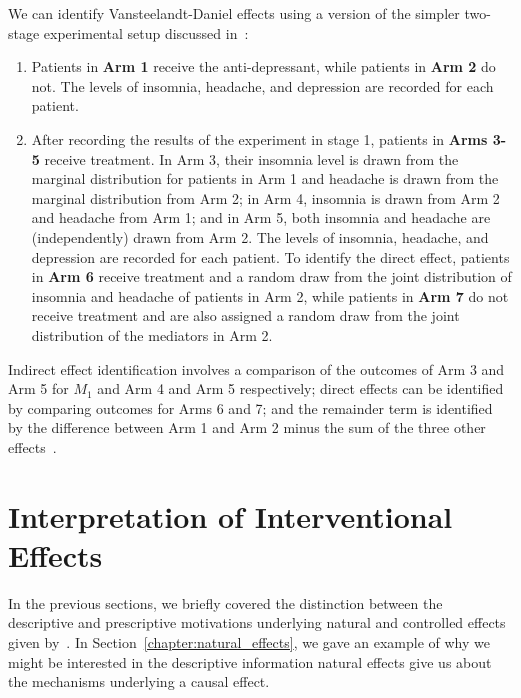 We can identify Vansteelandt-Daniel effects using a version of the 
simpler two-stage experimental setup discussed in~\cite{morenobetancur2018}:

\begin{experiment}\label{exp:vd_effects}
\indent 
\begin{enumerate}[noitemsep,topsep=0pt]
	\item Patients in \textbf{Arm 1} receive the anti-depressant, while patients in \textbf{Arm 2} do not. 
	The levels of insomnia, headache, and depression are recorded for each patient.
	\item After recording the results of the experiment in stage 1, patients in \textbf{Arms 3-5} 
	receive treatment. In Arm 3, their insomnia level is drawn from the marginal distribution
	for patients in Arm 1 and headache is drawn from the marginal distribution from Arm 2; in Arm 4, insomnia is 
	drawn from Arm 2 and headache from Arm 1; and in Arm 5, both insomnia and headache are (independently)
	drawn from Arm 2. The levels of insomnia, headache, and depression are recorded for each patient. 
	To identify the direct effect, patients in \textbf{Arm 6} receive treatment 
	and a random draw from the joint distribution of insomnia and headache of patients in Arm 2, 
	while patients in \textbf{Arm 7} do not receive treatment and are also assigned a random draw 
	from the joint distribution of the mediators in Arm 2. 
\end{enumerate}
\end{experiment}

Indirect effect identification involves a comparison of the outcomes of Arm 3 and Arm 5 for $M_{1}$ and 
Arm 4 and Arm 5 respectively; direct effects can be identified by comparing outcomes for Arms 6
and 7; and the remainder term is identified by the difference between Arm 1 and Arm 2 minus the sum of 
the three other effects~\citep{morenobetancur2018}. 

\section{Interpretation of Interventional Effects}\label{subsection:interpretation}

In the previous sections, we briefly covered the distinction between the descriptive and prescriptive 
motivations underlying natural and controlled effects given by~\cite{pearl2001}. In 
Section~\ref{chapter:natural_effects}, we gave an example of why we might be interested in the 
descriptive information natural effects give us about the mechanisms underlying a causal effect. 

